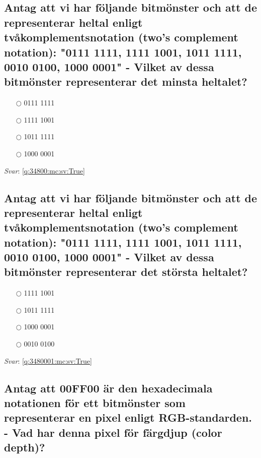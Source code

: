 \documentclass[a4paper,11pt,oneside]{article}
\begin{document}
\begin{sloppypar}
\subsection{Antag att vi har f\"oljande bitm\"onster och att de representerar heltal enligt tv\r{a}komplementsnotation (two{\textquoteright}s complement notation): "0111 1111, 1111 1001, 1011 1111, 0010 0100, 1000 0001" - Vilket av dessa bitm\"onster representerar det minsta heltalet?}

\label{q:34800:mc:sv:False}

\begin{itemize}
  \item[$\bigcirc$] 0111 1111
  \item[$\bigcirc$] 1111 1001
  \item[$\bigcirc$] 1011 1111
  \item[$\bigcirc$] 1000 0001
\end{itemize}

\vspace{1cm}

\textit{Svar}: \autoref{q:34800:mc:sv:True}

\subsection{Antag att vi har f\"oljande bitm\"onster och att de representerar heltal enligt tv\r{a}komplementsnotation (two{\textquoteright}s complement notation): "0111 1111, 1111 1001, 1011 1111, 0010 0100, 1000 0001" - Vilket av dessa bitm\"onster representerar det st\"orsta heltalet?}

\label{q:3480001:mc:sv:False}

\begin{itemize}
  \item[$\bigcirc$] 1111 1001
  \item[$\bigcirc$] 1011 1111
  \item[$\bigcirc$] 1000 0001
  \item[$\bigcirc$] 0010 0100
\end{itemize}

\vspace{1cm}

\textit{Svar}: \autoref{q:3480001:mc:sv:True}



\subsection{Antag att 00FF00 \"ar den hexadecimala notationen f\"or ett bitm\"onster som representerar en pixel enligt RGB-standarden. - Vad har denna pixel f\"or f\"argdjup (color depth)?}


\end{sloppypar}
\end{document}
